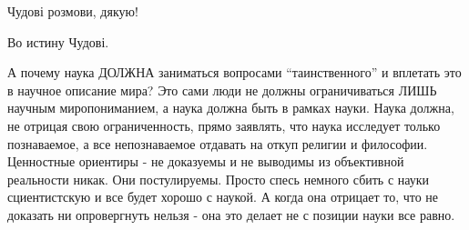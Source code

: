 \begin{multicols}{2}
Чудові розмови, дякую!

Во истину Чудові.


А почему наука ДОЛЖНА заниматься вопросами \enquote{таинственного} и вплетать это в
научное описание мира? Это сами люди не должны ограничиваться ЛИШЬ научным
миропониманием, а наука должна быть в рамках науки. Наука должна, не отрицая
свою ограниченность, прямо заявлять, что наука исследует только познаваемое, а
все непознаваемое отдавать на откуп религии и философии. Ценностные ориентиры -
не доказуемы и не выводимы из объективной реальности никак. Они постулируемы.
Просто спесь немного сбить с науки сциентистскую и все будет хорошо с наукой. А
когда она отрицает то, что не доказать ни опровергнуть нельзя - она это делает
не с позиции науки все равно.

\end{multicols} %

